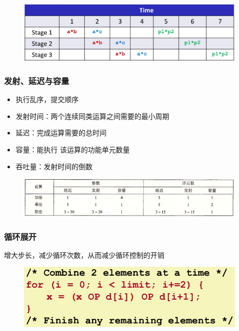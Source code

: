 \documentclass[12pt,AutoFakeBold,aspectratio=43,mathserif]{beamer}
\begin{document}
{\begin{frame}
        \begin{figure}
            \includegraphics[width=\textwidth]{figures/9.png}
        \end{figure}
    
    \end{frame}

    \begin{frame}
        \frametitle{发射、延迟与容量}

        \begin{itemize}
            \item 执行乱序，提交顺序
            \item 发射时间：两个连续同类运算之间需要的最小周期
            \item 延迟：完成运算需要的总时间
            \item 容量：能执行 该运算的功能单元数量
            \item 吞吐量：发射时间的倒数
        \end{itemize}
    
        \begin{figure}
            \includegraphics[width=\textwidth]{figures/10.png}
        \end{figure}
    
    \end{frame}

    \begin{frame}
        \frametitle{循环展开}
    
        增大步长，减少循环次数，从而减少循环控制的开销

        \begin{figure}
            \includegraphics[width=.5\textwidth]{figures/11.png}
        \end{figure}
        

\end{frame}}
\end{document}
